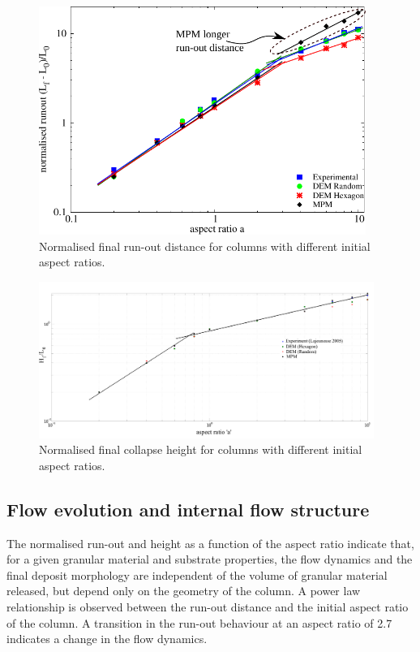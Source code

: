 \begin{figure}[tbhp]
\centering
\includegraphics[width=0.95\textwidth]{runout}
\caption{Normalised final run-out distance for columns with different initial 
aspect ratios.}
\label{fig:run-out}
\end{figure}

\begin{figure}[tbhp]
\centering
\includegraphics[width=0.975\textwidth]{height}
\caption{Normalised final collapse height for columns with different initial 
aspect ratios.}
\label{fig:height}
\end{figure}

\subsection{Flow evolution and internal flow structure}

The normalised run-out and height as a function of the aspect ratio indicate 
that, for a given granular material and substrate properties, the flow dynamics 
and the final deposit morphology are independent of the volume of granular 
material released, but depend only on the geometry of the column. A 
power law relationship is observed between the run-out distance and the initial 
aspect ratio of the column. A transition in the run-out behaviour at an aspect 
ratio of 2.7 indicates a change in the flow dynamics. 


